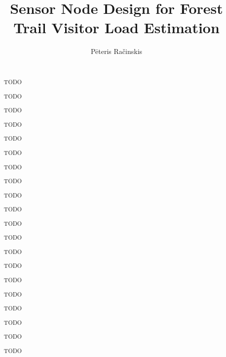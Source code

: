 \documentclass[10pt,nocopyrightspace]{ewsn-proc}
\author{
\alignauthor Pēteris Račinskis \\
    \affaddr{University of Latvia}\\
    \email{pr13001@edu.lu.lv}
}
\title{Sensor Node Design for Forest Trail Visitor Load Estimation}
\begin{document}
\maketitle

\begin{abstract}
TODO

TODO 

TODO

TODO

TODO

TODO

TODO 

TODO

TODO

TODO

TODO

TODO 

TODO

TODO

TODO

TODO

TODO 

TODO

TODO

TODO

\end{abstract}

%
%

%
\end{document}
